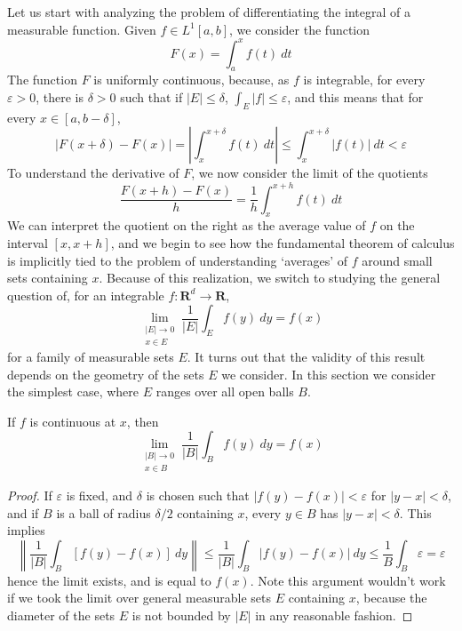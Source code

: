 Let us start with analyzing the problem of differentiating the integral of a measurable function. Given $f \in L^1[a,b]$, we consider the function
%
\[ F(x) = \int_a^x f(t)\ dt \]
%
The function $F$ is uniformly continuous, because, as $f$ is integrable, for every $\varepsilon > 0$, there is $\delta > 0$ such that if $|E| \leq \delta$, $\int_E |f| \leq \varepsilon$, and this means that for every $x \in [a,b-\delta]$,
%
\[ |F(x + \delta) - F(x)| = \left| \int_{x}^{x+\delta} f(t)\ dt \right| \leq \int_x^{x+\delta} |f(t)|\ dt < \varepsilon \]
%
To understand the derivative of $F$, we now consider the limit of the quotients
%
\[ \frac{F(x+h) - F(x)}{h} = \frac{1}{h} \int_x^{x+h} f(t)\ dt \]
%
We can interpret the quotient on the right as the average value of $f$ on the interval $[x,x+h]$, and we begin to see how the fundamental theorem of calculus is implicitly tied to the problem of understanding `averages' of $f$ around small sets containing $x$. Because of this realization, we switch to studying the general question of, for an integrable $f: \mathbf{R}^d \to \mathbf{R}$,
%
\[ \lim_{\substack{|E| \to 0\\x \in E}} \frac{1}{|E|} \int_E f(y)\ dy = f(x) \]
%
for a family of measurable sets $E$. It turns out that the validity of this result depends on the geometry of the sets $E$ we consider. In this section we consider the simplest case, where $E$ ranges over all open balls $B$.

\begin{lemma}
    If $f$ is continuous at $x$, then
    \[ \lim_{\substack{|B| \to 0\\x \in B}} \frac{1}{|B|} \int_B f(y)\ dy = f(x) \]
\end{lemma}
\begin{proof}
    If $\varepsilon$ is fixed, and $\delta$ is chosen such that $|f(y) - f(x)| < \varepsilon$ for $|y - x| < \delta$, and if $B$ is a ball of radius $\delta/2$ containing $x$, every $y \in B$ has $|y - x| < \delta$. This implies
    \[ \left\| \frac{1}{|B|} \int_B [f(y) - f(x)]\ dy \right\| \leq \frac{1}{|B|} \int_B |f(y) - f(x)|\ dy \leq \frac{1}{B} \int_B \varepsilon = \varepsilon \]
    hence the limit exists, and is equal to $f(x)$. Note this argument wouldn't work if we took the limit over general measurable sets $E$ containing $x$, because the diameter of the sets $E$ is not bounded by $|E|$ in any reasonable fashion.
\end{proof}

